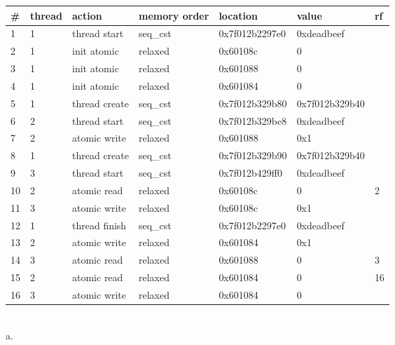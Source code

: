 \makeatletter
\renewenvironment{table}%
  {\renewcommand{\familydefault}{\ttdefault}\selectfont
  \@float{table}}
  {\end@float}
\makeatother

\small
\begin{tabular}{l l l l l l l}
\hline
\textbf{\#} & \textbf{thread} & \textbf{action} & \textbf{memory order} & \textbf{location} & \textbf{value} & \textbf{rf}\\
\hline\hline
1 & 1 & thread start & seq\_cst & 0x7f012b2297e0 & 0xdeadbeef\\
\hline
2 & 1 & init atomic & relaxed & 0x60108c & 0\\
\hline
3 & 1 & init atomic & relaxed & 0x601088 & 0\\
\hline
4 & 1 & init atomic & relaxed & 0x601084 & 0\\
\hline
5 & 1 & thread create & seq\_cst & 0x7f012b329b80 & 0x7f012b329b40\\
\hline
6 & 2 & thread start & seq\_cst & 0x7f012b329be8 & 0xdeadbeef\\
\hline
7 & 2 & atomic write & relaxed & 0x601088 & 0x1\\
\hline
8 & 1 & thread create & seq\_cst & 0x7f012b329b90 & 0x7f012b329b40\\
\hline
9 & 3 & thread start & seq\_cst & 0x7f012b429ff0 & 0xdeadbeef\\
\hline
10 & 2 & atomic read & relaxed & 0x60108c & 0 & 2\\
\hline
11 & 3 & atomic write & relaxed & 0x60108c & 0x1\\
\hline
12 & 1 & thread finish & seq\_cst & 0x7f012b2297e0 & 0xdeadbeef\\
\hline
13 & 2 & atomic write & relaxed & 0x601084 & 0x1\\
\hline
14 & 3 & atomic read & relaxed & 0x601088 & 0 & 3\\
\hline
15 & 2 & atomic read & relaxed & 0x601084 & 0 & 16\\
\hline
16 & 3 & atomic write & relaxed & 0x601084 & 0\\
\hline

\end{tabular}\\

a.\\

